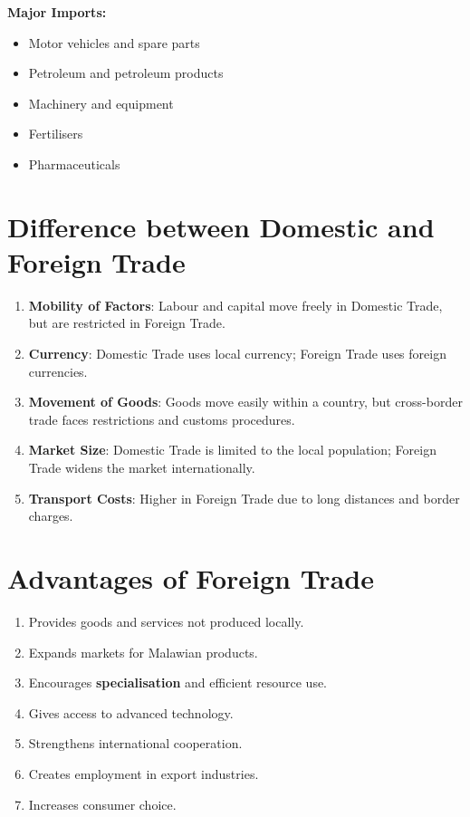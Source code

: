 \documentclass[14pt,a4paper, openany]{book}
\begin{document}
\textbf{Major Imports:}
\begin{itemize}
	\item Motor vehicles and spare parts
	\item Petroleum and petroleum products
	\item Machinery and equipment
	\item Fertilisers
	\item Pharmaceuticals
\end{itemize}

\section{Difference between Domestic and Foreign Trade}
\begin{enumerate}
	\item \textbf{Mobility of Factors}: Labour and capital move freely in Domestic Trade, but are restricted in Foreign Trade.
	\item \textbf{Currency}: Domestic Trade uses local currency; Foreign Trade uses foreign currencies.
	\item \textbf{Movement of Goods}: Goods move easily within a country, but cross-border trade faces restrictions and customs procedures.
	\item \textbf{Market Size}: Domestic Trade is limited to the local population; Foreign Trade widens the market internationally.
	\item \textbf{Transport Costs}: Higher in Foreign Trade due to long distances and border charges.
\end{enumerate}

\section{Advantages of Foreign Trade}
\begin{enumerate}
	\item Provides goods and services not produced locally.
	\item Expands markets for Malawian products.
	\item Encourages \textbf{specialisation} and efficient resource use.
	\item Gives access to advanced technology.
	\item Strengthens international cooperation.
	\item Creates employment in export industries.
	\item Increases consumer choice.
\end{enumerate}
\end{document}
